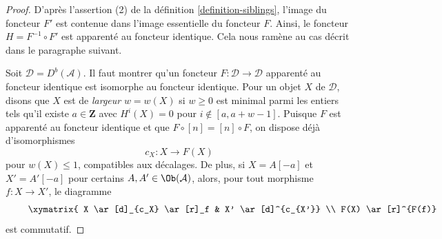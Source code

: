 \begin{proof}
D'après l'assertion (2) de la définition \ref{definition-siblings}, l'image du foncteur
$F'$ est contenue dans l'image essentielle du foncteur $F$. Ainsi,
le foncteur $H = F^{-1} \circ F'$ est apparenté au foncteur identique.
Cela nous ramène au cas décrit dans le paragraphe suivant.

\medskip\noindent
Soit $\mathcal{D} = D^b(\mathcal{A})$. Il faut montrer qu'un foncteur
$F : \mathcal{D} \to \mathcal{D}$ apparenté au foncteur identique est
isomorphe au foncteur identique. Pour un objet $X$ de $\mathcal{D}$,
disons que $X$ est de {\it largeur} $w = w(X)$ si $w \geq 0$ est minimal
parmi les entiers tels qu'il existe $a \in \mathbf{Z}$ avec $H^i(X) = 0$
pour $i \not \in [a, a + w - 1]$. Puisque $F$ est apparenté au foncteur identique
et que $F \circ [n] = [n] \circ F$, on dispose déjà d'isomorphismes
$$
c_X : X \to F(X)
$$
pour $w(X) \leq 1$, compatibles aux décalages. De plus, si $X = A[-a]$ et
$X' = A'[-a]$ pour certains $A, A' \in \Ob(\mathcal{A})$, alors, pour tout morphisme
$f : X \to X'$, le diagramme
\begin{equation}
\label{equation-to-show}
\vcenter{
\xymatrix{
X \ar[d]_{c_X} \ar[r]_f &
X' \ar[d]^{c_{X'}} \\
F(X) \ar[r]^{F(f)} &
F(X')
}
}
\end{equation}
est commutatif.


\end{proof}
